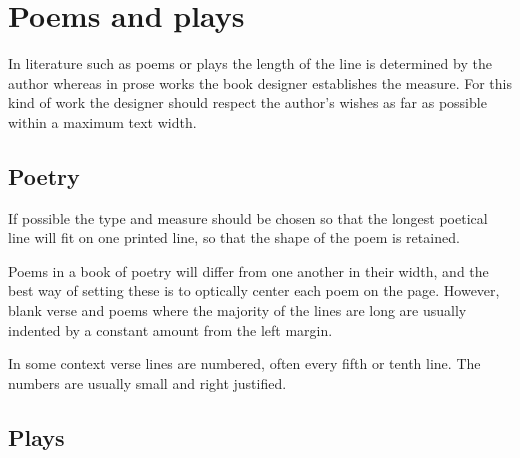 \documentclass[10pt,a4paper,oneside,extrafontsizes]{memoir}%
\begin{document}
\section{Poems and plays}

\begin{paracol}{2}
\switchEng
    In literature such as poems or plays 
the length of the line is determined
by the author whereas in prose works the book designer establishes the measure.
For this kind of work the designer should respect the author's wishes as 
far as possible within a maximum text width.
\end{paracol}

\subsection{Poetry}

\begin{paracol}{2}
\switchEng
    If possible the type and measure should be chosen so that the longest
poetical line will fit on one printed line, so that the shape of the poem
is retained.

    Poems in a book of poetry will differ from one another in their width, 
and the best way of setting these is to optically center each poem on the 
page. However, blank verse and poems where the majority of the lines are
long are usually indented by a constant amount from the left margin.

    In some context verse lines are numbered, often every fifth or tenth line.
The numbers are usually small and right justified.
\end{paracol}

\subsection{Plays}
\end{document}

